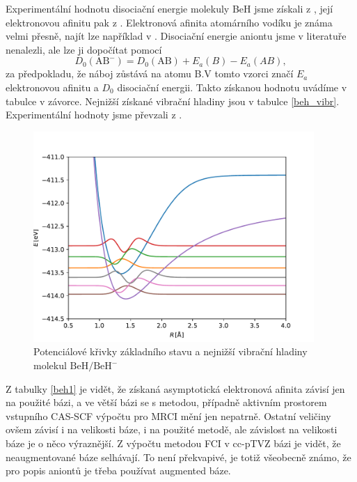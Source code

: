 Experimentální hodnotu disociační energie molekuly BeH jsme získali 
z \cite{BeH-LeRoy}, její elektronovou afinitu pak z \cite{BeH-ElAf}. Elektronová 
afinita atomárního vodíku je známa velmi přesně, 
najít lze například v \cite{H-ElAf}. Disociační energie aniontu jsme 
v literatuře nenalezli, ale
lze ji dopočítat pomocí
\begin{equation}
D_0(\mathrm{AB^-}) = D_0(\mathrm{AB}) + E_{a}(B) - E_{a}(AB), \label{eq_andiss}
\end{equation}
za předpokladu, že náboj zůstává na atomu B.V tomto vzorci značí $E_{a}$ elektronovou afinitu a $D_0$ disociační energii. Takto získanou hodnotu uvádíme v tabulce v závorce.
Nejnižší získané vibrační hladiny jsou v tabulce \ref{beh_vibr}.
Experimentální hodnoty jsme převzali z \cite{BeH-LeRoy}.
   
\begin{figure}
\centering
\includegraphics[width=0.95\textwidth]{../img/BeH-vibr1.pdf}
\caption{Potenciálové křivky základního stavu a nejnižší vibrační hladiny molekul $\mathrm{BeH/BeH^-}$}
\label{VibrBeH1}
\end{figure}
Z tabulky \ref{beh1} je vidět, že získaná asymptotická elektronová afinita závisí jen 
na použité bázi, a ve větší bázi se s metodou, případně aktivním prostorem vstupního 
CAS-SCF 
výpočtu pro MRCI mění jen nepatrně. Ostatní veličiny ovšem závisí i na velikosti báze, 
i na použité metodě, ale závislost na velikosti báze je o něco výraznější.
Z výpočtu metodou FCI v cc-pTVZ bázi je vidět,
že neaugmentované báze selhávají. To není 
překvapivé, je totiž všeobecně známo, že pro popis aniontů je třeba používat augmented 
báze.

